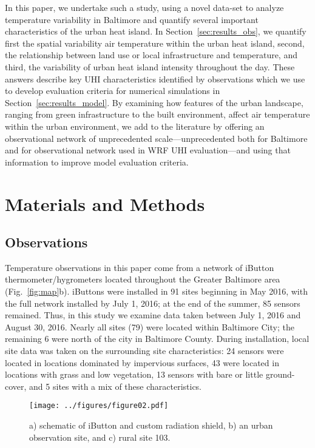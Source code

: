 \documentclass[draft,linenumbers]{agujournal}
\begin{document}
In this paper, we undertake such a study, using 
 a novel data-set to analyze temperature variability in Baltimore and quantify several important characteristics of the urban heat island. 
 In Section~\ref{sec:results_obs}, we quantify first the spatial variability air temperature within the urban heat island, second, the relationship between land use or local infrastructure and temperature, and third, the variability of urban heat island intensity throughout the day.
These answers describe key UHI characteristics identified by observations which we use to develop evaluation criteria for numerical simulations in Section~\ref{sec:results_model}. 
By examining how features of the urban landscape, ranging from green infrastructure to the built environment, affect air temperature within the urban environment, we add to the literature by offering an observational network of unprecedented scale---unprecedented both for Baltimore and for observational network used in WRF UHI evaluation---and using that information to improve model evaluation criteria. 



\section{Materials and Methods}\label{sec:methods}\label{sec:Methods}

\subsection{Observations}
\label{sec:methods_obs}
Temperature observations in this paper come from a network of iButton thermometer/hygrometers located throughout the Greater Baltimore area (Fig.~\ref{fig:map}b). 
iButtons were installed in 91 sites beginning in May 2016, with the full network installed by July 1, 2016; at the end of the summer, 85 sensors remained. Thus, in this study we examine data taken between July 1, 2016 and August 30, 2016. Nearly all sites (79) were located within Baltimore City; the remaining 6 were north of the city in Baltimore County. During installation, local site data was taken on the surrounding site characteristics: 24 sensors were located in locations dominated by impervious surfaces, 43 were located in locations with grass and low vegetation, 13 sensors with bare or little ground-cover, and 5 sites with a mix of these characteristics. 

 \begin{figure}
\centering
\texttt{[image: ../figures/figure02.pdf]}
\caption{a) schematic of iButton and custom radiation shield, b) an urban observation site, and c) rural site 103.}
\label{fig:ibutton}
 \end{figure}
\end{document}
